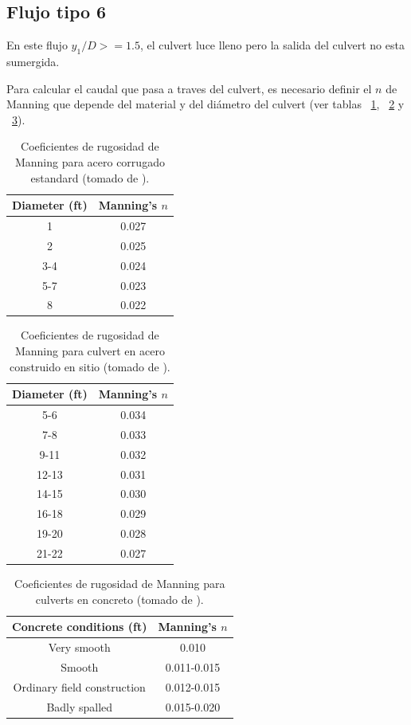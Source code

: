 \documentclass[11pt, oneside]{article}
\begin{document}
\subsection*{Flujo tipo 6}
En este flujo $y_1/D >= 1.5$, el culvert luce lleno pero la salida del culvert no esta sumergida.  

Para calcular el caudal que pasa a traves del culvert, es necesario definir el $n$ de Manning que depende del material y del di\'ametro del culvert (ver tablas ~\ref{tab1}, ~\ref{tab2} y ~\ref{tab3}).
\begin{table}[h!]
\centering
\begin{tabular}{c c}
 \hline
 Diameter (ft) & Manning's $n$ \\ [0.5ex]
 \hline\hline
 1 & 0.027 \\
 2 & 0.025 \\
 3-4 & 0.024 \\
 5-7 & 0.023 \\
 8 & 0.022 \\
\hline
\end{tabular}
\caption{Coeficientes de rugosidad de Manning para acero corrugado estandard (tomado de \cite{French}).}
\label{tab1}
\end{table}

\begin{table}[h!]
\centering
\begin{tabular}{c c}
 \hline
 Diameter (ft) & Manning's $n$ \\ [0.5ex]
 \hline\hline
 5-6 & 0.034 \\
 7-8 & 0.033 \\
 9-11 & 0.032 \\
 12-13 & 0.031 \\
 14-15 & 0.030 \\
 16-18 & 0.029 \\
 19-20 & 0.028 \\
 21-22 & 0.027 \\
\hline
\end{tabular}
\caption{Coeficientes de rugosidad de Manning para culvert en acero construido en sitio (tomado de \cite{French}).}
\label{tab2}
\end{table}

\begin{table}[h!]
\centering
\begin{tabular}{c c}
 \hline
 Concrete conditions (ft) & Manning's $n$ \\ [0.5ex]
 \hline\hline
 Very smooth & 0.010 \\
 Smooth & 0.011-0.015 \\
 Ordinary field construction & 0.012-0.015 \\
 Badly spalled & 0.015-0.020 \\
\hline
\end{tabular}
\caption{Coeficientes de rugosidad de Manning para culverts en concreto (tomado de \cite{French}).}
\label{tab3}
\end{table}
\end{document}
